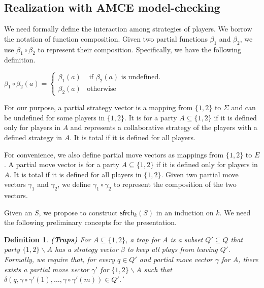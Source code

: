\documentclass[times,10pt,twocolumn]{article}
\newtheorem{definition}{Definition}
\newcommand\safe{\mathsf{sfrch}}
\newcommand\qed{\hfill\ensuremath{\Box}}
\def\qed{\ifmmode\|\else{\unskip\nobreak\hfil
\penalty50\hskip1em\null\nobreak\hfil$\blacksquare$
\parfillskip=0pt\finalhyphendemerits=0\endgraf}\fi}
\begin{document}
\subsection{Realization with AMCE model-checking 
\label{subsec:kSafety}
}

We need formally define the interaction among strategies of players. 
We borrow the notation of function composition. 
Given two partial functions $\beta_1$ and $\beta_2$, 
we use $\beta_1\circ \beta_2$ to represent their composition.  
Specifically, we have the following definition.  
\begin{center} 
$\beta_1\circ\beta_2(a)=\left\{\begin{array}{ll} 
\beta_1(a) & \mbox{ if } \beta_2(a)\mbox{ is undefined}.\\
\beta_2(a) & %
\mbox{otherwise} 
\end{array}\right.$
\label{reply1.compose} 
\end{center} 
% 
For our purpose, a partial strategy vector is a mapping from $\{1,2\}$ to $\Sigma$ 
and can be undefined for some players in $\{1,2\}$.  
It is for a party $A\subseteq \{1,2\}$ if it is defined only for players in $A$
and represents a collaborative strategy of the players with a 
defined strategy in $A$.  
It is total if it is defined for all players.  


For convenience, we also define partial move vectors 
as mappings\label{reply2.mapping.s} from $\{1,2\}$ to $E$.  
A partial move vector is for a party $A\subseteq\{1,2\}$ if it is defined only for players in $A$.  
It is total if it is defined for all players in $\{1,2\}$.  
Given two partial move vectors $\gamma_1$ and $\gamma_2$, \label{reply1.m2gamma} 
we define $\gamma_1\circ\gamma_2$ to represent the composition of 
the two vectors.  

Given an $S$, 
we propose to construct $\safe_k(S)$ in an induction on\label{induction.on.k} $k$.  
We need the following preliminary concepts for the presentation. 


\begin{definition} 
\textbf{(Traps)}
\label{def.traps}
For $A\subseteq \{1,2\}$,
a {\em trap} for $A$ is a subset $Q'\subseteq Q$ 
that party $\{1,2\}\smallsetminus A$ has a strategy vector $\beta$ 
to keep all plays from leaving $Q'$.  
Formally, we require that, for every $q\in Q'$ 
and partial move vector $\gamma$ for $A$, 
there exists a partial move vector $\gamma'$ for $\{1,2\}\smallsetminus A$ 
such that $\delta(q,\gamma\circ\gamma'(1),\ldots,\gamma\circ\gamma'(m))\in Q'$. 
\qed
\end{definition}
\end{document}
